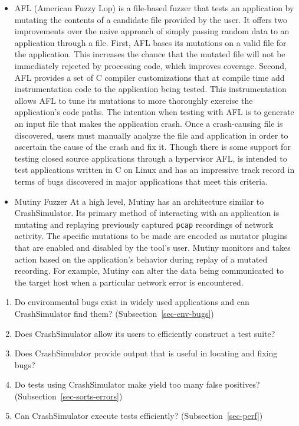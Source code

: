 \begin{itemize}

\item{AFL} (American Fuzzy Lop) is a file-based fuzzer that tests an
application by mutating the contents of a candidate file provided by
the user.  It offers two improvements over the naive approach of simply
passing random data to an application through a file.  First, AFL
bases its mutations on a valid file for the application.  This
increases the chance that the mutated file will not be immediately rejected
by
processing code, which improves coverage.  Second, AFL provides a set of
C compiler customizations
that at compile time add instrumentation code to the
application being tested.  This instrumentation
allows AFL to tune its mutations to more thoroughly exercise the
application's code paths.  The intention when testing with AFL is
to generate an input file that makes the application crash.  Once a
crash-causing file is discovered, users must manually analyze the
file and application in order to ascertain the cause of the crash
and fix it.  Though there is some support for testing closed source
applications through a hypervisor AFL, is intended to test
applications written in C on Linux and has an impressive track
record in terms of bugs discovered in major applications that meet
this criteria.

\item{Mutiny Fuzzer} At a high level, Mutiny has an architecture similar to
CrashSimulator.  Its primary method of interacting with an application
is mutating and replaying previously captured {\tt pcap} recordings
of network activity.  The specific mutations to be made are encoded
as mutator plugins that are enabled and disabled by the tool's
user.  Mutiny monitors and takes action based on the application's
behavior during replay of a mutated recording.  For example, Mutiny
can alter the data being communicated to the target host when a
particular network error is encountered.

\end{itemize}
\begin{enumerate}

\item{Do environmental bugs exist in widely used applications and can
      CrashSimulator find them? (Subsection~\ref{sec-env-bugs})}

\item Does CrashSimulator allow its users to efficiently construct a test suite?

\item Does CrashSimulator provide output that is useful in locating and
fixing bugs?

\item{Do tests using CrashSimulator make yield too many false positives?
      (Subsection~\ref{sec-sorts-errors})}

\item{Can CrashSimulator
      execute tests efficiently? (Subsection~\ref{sec-perf})}

\end{enumerate}


